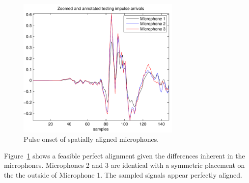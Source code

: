 \begin{figure}
  \centering
  \includegraphics[width=8cm]{alignedTestingImpulses.pdf}%
\caption{Pulse onset of spatially aligned microphones.}
\label{fig:micsalignedOnset}
\end{figure}

Figure~\ref{fig:micsalignedOnset} shows a feasible perfect alignment given the differences inherent in the microphones. Microphones 2 and 3 are identical with a symmetric placement on the the outside of Microphone 1. The sampled signals appear perfectly aligned.


